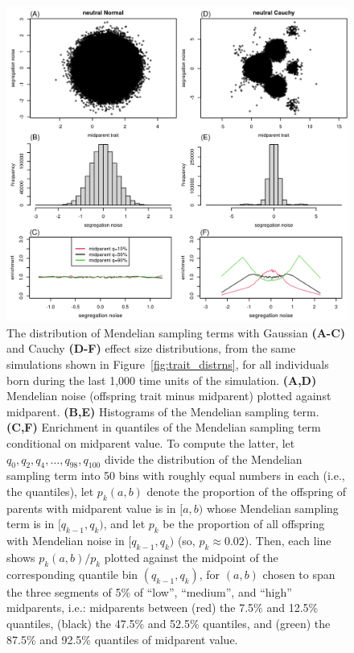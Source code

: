 \documentclass{article}
\newcommand{\1}{\mathbbm{1}}
\theoremstyle{remark}
\theoremstyle{definition}
\begin{document}
\begin{figure}
    \begin{center}
        \includegraphics{sims/neutral_seg_noise}
    \end{center}
    \caption{
        The distribution of Mendelian sampling terms
        with Gaussian \textbf{(A-C)} and Cauchy \textbf{(D-F)} effect size distributions,
        from the same simulations shown in Figure~\ref{fig:trait_distrns},
        for all individuals born during the last 1,000 time units of the simulation.
        \textbf{(A,D)} Mendelian noise (offspring trait minus midparent) plotted against midparent.
        \textbf{(B,E)} Histograms of the Mendelian sampling term.
        \textbf{(C,F)} Enrichment in quantiles of the Mendelian sampling term conditional on midparent value.
        To compute the latter,
        let $q_0, q_2, q_4, \ldots, q_{98}, q_{100}$ divide the distribution of the Mendelian sampling term
        into 50 bins with roughly equal numbers in each (i.e., the quantiles),
        let $p_k(a,b)$ denote the proportion of the offspring of parents with midparent value
        is in $[a, b)$ whose Mendelian sampling term is in $[q_{k-1}, q_k)$,
        and let $p_k$ be the proportion of all offspring with Mendelian noise in $[q_{k-1}, q_k)$
        (so, $p_k \approx 0.02$).
        Then, each line shows $p_k(a,b)/p_k$
        plotted against the midpoint of the corresponding quantile bin $(q_{k-1},q_k)$,
        for $(a,b)$ chosen to span the three segments of 5\% of
        ``low'', ``medium'', and ``high'' midparents, i.e.:
        midparents between (red) the 7.5\% and 12.5\% quantiles,
        (black) the 47.5\% and 52.5\% quantiles, and
        (green) the 87.5\% and 92.5\% quantiles of midparent value.
        \label{fig:seg_noise}
    }
\end{figure}
\end{document}
